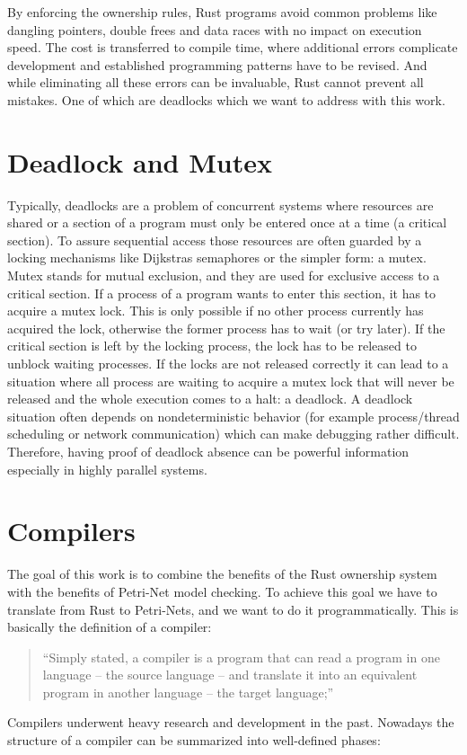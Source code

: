 By enforcing the ownership rules, Rust programs avoid common problems like dangling pointers, double frees and data races\cite{Matsakis:2014:RL:2692956.2663188} with no impact on execution speed.
The cost is transferred to compile time, where additional errors complicate development and established programming patterns have to be revised.
And while eliminating all these errors can be invaluable, Rust cannot prevent all mistakes.
One of which are deadlocks\cite[Chapter 8.1]{nomicon} which we want to address with this work.

\section{Deadlock and Mutex}
Typically, deadlocks are a problem of concurrent systems where resources are shared or a section of a program must only be entered once at a time (a critical section).
To assure sequential access those resources are often guarded by a locking mechanisms like Dijkstras semaphores\cite{dijkstra1968cooperating} or the simpler form: a mutex.
Mutex stands for mutual exclusion, and they are used for exclusive access to a critical section.
If a process of a program wants to enter this section, it has to acquire a mutex lock.
This is only possible if no other process currently has acquired the lock, otherwise the former process has to wait (or try later).
If the critical section is left by the locking process, the lock has to be released to unblock waiting processes.
If the locks are not released correctly it can lead to a situation where all process are waiting to acquire a mutex lock that will never be released and the whole execution comes to a halt: a deadlock.
A deadlock situation often depends on nondeterministic behavior (for example process/thread scheduling or network communication) which can make debugging rather difficult.
Therefore, having proof of deadlock absence can be powerful information especially in highly parallel systems.

\section{Compilers}
The goal of this work is to combine the benefits of the Rust ownership system with the benefits of Petri-Net model checking.
To achieve this goal we have to translate from Rust to Petri-Nets, 
and we want to do it programmatically.
This is basically the definition of a compiler\cite[Chapter 1.1]{aho1986compilers}:
\begin{quote}
``Simply stated, a compiler is a program that can read a program in one language -- the source language -- and translate it into an equivalent program in another language -- the target language;''
\end{quote}
Compilers underwent heavy research and development in the past.
Nowadays the structure of a compiler can be summarized into well-defined phases\cite[Chapter 1.2]{aho1986compilers}:

